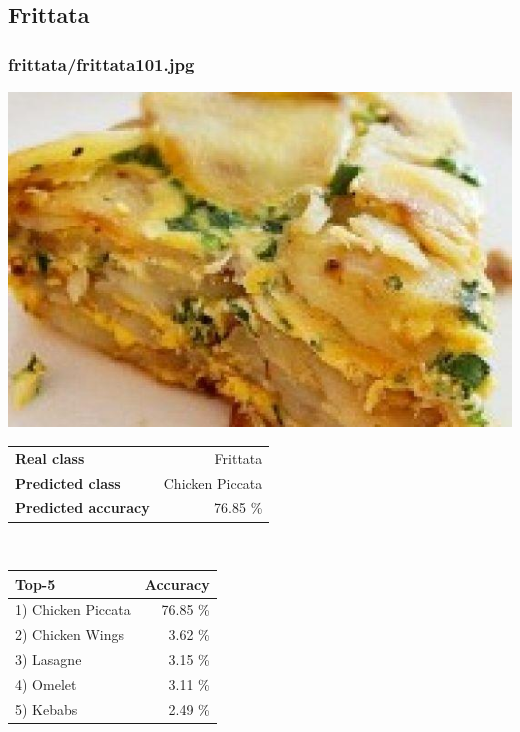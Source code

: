 \subsection{Frittata}
    
\subsubsection{frittata/frittata101.jpg}

\begin{minipage}[t]{0.4\textwidth}
	\vspace{0pt}
	\includegraphics[width=\linewidth]{images/evaluation-images/frittata/frittata101.jpg}
\end{minipage}
\hfill
\begin{minipage}[t]{0.5\textwidth}
	\vspace{0pt}\raggedright
	\begin{tabularx}{\textwidth}{X r}
		\small \textbf{Real class} & \small Frittata\\
		\small \textbf{Predicted class} & \small Chicken Piccata\\
		\small \textbf{Predicted accuracy} & \small 76.85 \%
    \end{tabularx}\\
    
    \vspace{6pt}
	\begin{tabularx}{\textwidth}{X r}
        \small \textbf{Top-5} & \small \textbf{Accuracy} \\
        \hline
		\small 1) Chicken Piccata & \small 76.85 \%\\\small 2) Chicken Wings & \small 3.62 \%\\\small 3) Lasagne & \small 3.15 \%\\\small 4) Omelet & \small 3.11 \%\\\small 5) Kebabs & \small 2.49 \%
    \end{tabularx}
\end{minipage}
    
